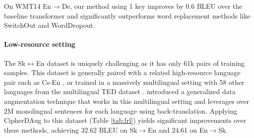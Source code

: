 \documentclass[11pt]{article}
\begin{document}
On WMT14 En$\rightarrow$De, our method using 1 key improves by 0.6 BLEU over the baseline transformer and significantly outperforms word replacement methods like SwitchOut and WordDropout. 



\paragraph{Low-resource setting} The Sk$\leftrightarrow$En dataset is uniquely challenging as it has only 61k pairs of training samples. This dataset is generally paired with a related high-resource language pair such as Cs-En \cite{neubig-hu-2018-rapid}, or trained in a massively multilingual setting \cite{aharoni-etal-2019-massively} with 58 other languages from the multilingual TED dataset \cite{qi-etal-2018-pre}. \citet{xia-etal-2019-generalized} introduced a generalized data augmentation technique that works in this multilingual setting and leverages over 2M monolingual sentences for each language using back-translation. Applying CipherDAug to this dataset (Table \ref{tab:lrl}) yields significant improvements over these methods, achieving 32.62 BLEU on Sk$\rightarrow$En and 24.61 on En$\rightarrow$Sk.
\end{document}
